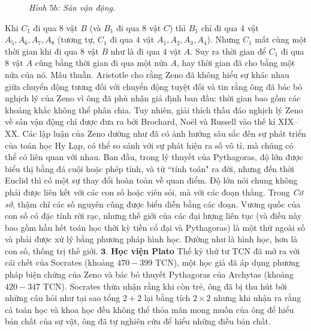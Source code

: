 \begin{multicols}{2}
\begin{figure}[H]
	\caption{\small\textit{\color{lichsutoanhoc}Hình $5b$: Sân vận động.}}
	\vspace*{-10pt}
	\end{figure}
	Khi $C_1$  đi qua $8$ vật $B$  (và $B_1$ đi qua 8 vật  $C$) thì $B_1$  chỉ đi qua $4$ vật $A_5, A_6, A_7, A_8$  (tương tự,  $C_1$  đi qua $4$ vật  $A_1, A_2, A_3, A_4$). Nhưng $C_1$  mất cùng một thời gian khi đi qua $8$ vật  $B$ như là đi qua $4$ vật $A$.  Suy ra thời gian để  $C_1$  đi qua $8$ vật $A$  cũng bằng thời gian đi qua một nửa $A$,  hay thời gian đã cho bằng một nửa của nó. Mâu thuẫn.     
	\vskip 0.1cm
	Aristotle cho rằng Zeno đã không hiểu sự khác nhau giữa chuyển động tương đối với chuyển động tuyệt đối và tin rằng ông đã bác bỏ nghịch lý của Zeno vì ông đã phủ nhận giả định ban đầu: thời gian bao gồm các khoảng khắc không thể phân chia. Tuy nhiên, giải thích thấu đáo nghịch lý Zeno về sân vận động chỉ được đưa ra bởi Brochard, Noël và Russell vào thế kỉ XIX--XX.
	\vskip 0.1cm 
	Các lập luận của Zeno dường như đã có ảnh hưởng sâu sắc đến sự phát triển của toán học Hy Lạp, có thể so sánh với sự phát hiện ra số vô tỉ, mà chúng có thể có liên quan với nhau. Ban đầu, trong lý thuyết của Pythagoras, độ lớn được biểu thị bằng đá cuội hoặc phép tính, và từ ``tính toán" ra đời, nhưng đến thời Euclid thì có một sự thay đổi hoàn toàn về quan điểm.  Độ lớn nói chung không phải được liên kết với các con số hoặc viên sỏi, mà với các đoạn thẳng. Trong \textit{Cơ sở}, thậm chí các số nguyên cũng được biểu diễn bằng các đoạn. Vương quốc của con số có đặc tính rời rạc, nhưng thế giới của các đại lượng liên tục (và điều này bao gồm hầu hết toán học thời kỳ tiền cổ đại và Pythagoras) là một thứ ngoài số và phải được xử lý bằng phương pháp hình học.  Dường như là hình học, hơn là con số, thống trị thế giới.
	\vskip 0.1cm
	$\pmb{3.}$ \textbf{\color{lichsutoanhoc}Học viện Plato}
	\vskip 0.1cm
	Thế kỷ thứ tư TCN đã mở ra với cái chết của Socrates (khoảng $470-399$ TCN), một học giả đã áp dụng phương pháp biện chứng của Zeno và bác bỏ thuyết Pythagoras của Archytas (khoảng $420-347$ TCN). Socrates thừa nhận rằng khi còn trẻ, ông đã bị thu hút bởi những câu hỏi như tại sao tổng $2 + 2$ lại bằng tích $2 \times 2$  nhưng khi nhận ra rằng cả toán học và khoa học đều không thể thỏa mãn mong muốn của ông để  hiểu bản chất của sự vật, ông đã tự nghiên cứu để hiểu những điều bản chất.
	\end{multicols}
